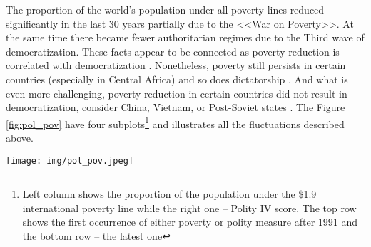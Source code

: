 \documentclass[a4paper, 12pt]{article}
\begin{document}
    \noindent The proportion of the world's population under all poverty lines reduced significantly in the last 30 years \parencite{wbpoverty20} partially due to the <<War on Poverty>>. At the same time there became fewer authoritarian regimes due to the Third wave of democratization. These facts appear to be connected as poverty reduction is correlated with democratization \parencite{poverty_democratization}. Nonetheless, poverty still persists \parencite{poverty_persistence} in certain countries (especially in Central Africa) and so does dictatorship \parencite{vdem, poverty_interplay}. And what is even more challenging, poverty reduction in certain countries did not result in democratization, consider China, Vietnam, or Post-Soviet states \parencite{autocratic_middle}. The Figure \ref{fig:pol_pov} have four subplots\footnote{Left column shows the proportion of the population under the \$1.9 international poverty line while the right one -- Polity IV score. The top row shows the first occurrence of either poverty or polity measure after 1991 and the bottom row -- the latest one} and illustrates all the fluctuations described above.
	\\
	\begin{sidewaysfigure}
	    \centering
	    \texttt{[image: img/pol\_pov.jpeg]}
	    \caption{Poverty and political regimes after 1991}
	    \label{fig:pol_pov}
	\end{sidewaysfigure}
    
\end{document}
